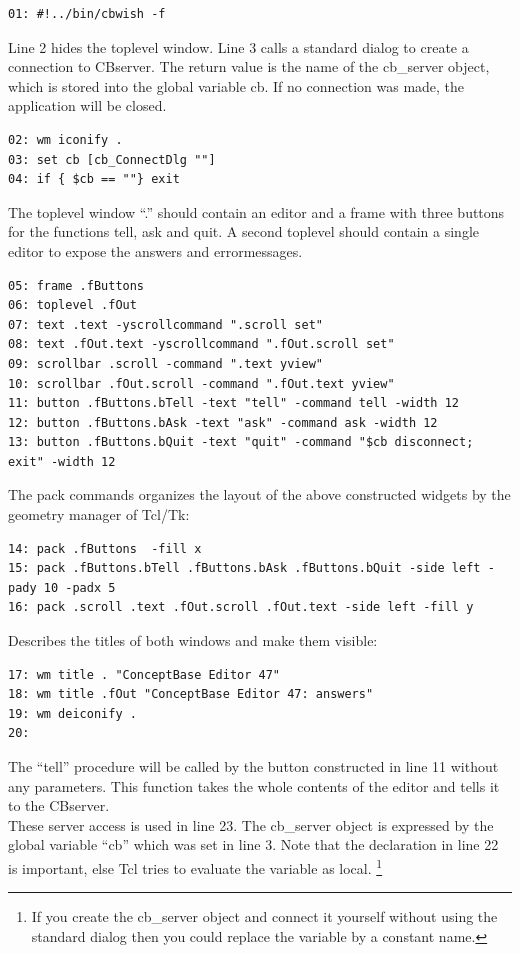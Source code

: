 \begin{verbatim}
01: #!../bin/cbwish -f
\end{verbatim}
	Line 2 hides the toplevel window.
	Line 3 calls a standard dialog to create a connection to CBserver. 
	The return value is the name of the cb\_server object, 
	 which is stored into the global variable cb.
	If no connection was made, the application will be closed.
\begin{verbatim}
02: wm iconify .
03: set cb [cb_ConnectDlg ""]
04: if { $cb == ""} exit
\end{verbatim}
	The toplevel window ``.'' should contain an editor 
	 and a frame with three buttons for the
	 functions tell, ask and quit.
	A second toplevel should contain a single editor
	 to expose the answers and errormessages.
\begin{verbatim}
05: frame .fButtons 
06: toplevel .fOut
07: text .text -yscrollcommand ".scroll set"
08: text .fOut.text -yscrollcommand ".fOut.scroll set"
09: scrollbar .scroll -command ".text yview"
10: scrollbar .fOut.scroll -command ".fOut.text yview"
11: button .fButtons.bTell -text "tell" -command tell -width 12
12: button .fButtons.bAsk -text "ask" -command ask -width 12
13: button .fButtons.bQuit -text "quit" -command "$cb disconnect; exit" -width 12
\end{verbatim}
	The pack commands organizes the layout
	 of the above constructed widgets by the 
	 geometry manager of Tcl/Tk:
\begin{verbatim}
14: pack .fButtons  -fill x
15: pack .fButtons.bTell .fButtons.bAsk .fButtons.bQuit -side left -pady 10 -padx 5
16: pack .scroll .text .fOut.scroll .fOut.text -side left -fill y
\end{verbatim}
	Describes the titles of both windows and make them visible:
\begin{verbatim}
17: wm title . "ConceptBase Editor 47"
18: wm title .fOut "ConceptBase Editor 47: answers"
19: wm deiconify .
20:
\end{verbatim}
	The ``tell'' procedure will be called by the button constructed in line 11 without
	 any parameters. This function takes the whole contents of the editor and tells it
	 to the CBserver.\\
	These server access is used in line 23. The cb\_server object is expressed by
	the global variable ``cb'' which was set in line 3. 
	Note that the declaration in line 22 is important, 
	 else Tcl tries to evaluate the variable as local.
	\footnote{
		If you create the cb\_server object and connect it yourself 
	 	 without using the standard dialog 
	 	then you could replace the variable by a constant name.
	}
